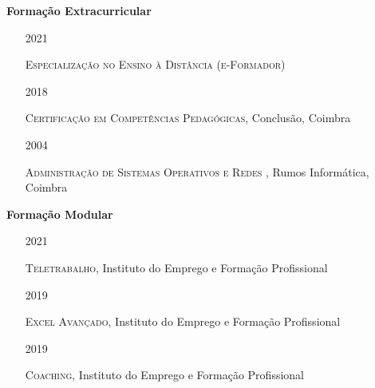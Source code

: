 \documentclass[10pt,a4paper,oneside]{article}
\newlength{\datewidth}
\newlength{\textindent}
\begin{document}
	\textbf{\hspace{\textindent}Formação Extracurricular}
	\begin{itemize}
		\item[\hspace{\datewidth}\scriptsize 2021] \parbox[t]{\dimexpr\linewidth-\datewidth-\textindent}{\textsc{Especialização no Ensino à Distância (e-Formador)}}
		\item[\hspace{\datewidth}\scriptsize 2018] \parbox[t]{\dimexpr\linewidth-\datewidth-\textindent}{\textsc{Certificação em Competências Pedagógicas}, Conclusão, Coimbra}
		\item[\hspace{\datewidth}\scriptsize 2004] \parbox[t]{\dimexpr\linewidth-\datewidth-\textindent}{\textsc{Administração de Sistemas Operativos e Redes }, Rumos Informática, Coimbra}
	\end{itemize}
	
	\vspace{5mm}
	
	\textbf{\hspace{\textindent}Formação Modular}
	\begin{itemize}
		\item[\hspace{\datewidth}\scriptsize 2021] \parbox[t]{\dimexpr\linewidth-\datewidth-\textindent}{\textsc{Teletrabalho}, Instituto do Emprego e Formação Profissional}
		\item[\hspace{\datewidth}\scriptsize 2019] \parbox[t]{\dimexpr\linewidth-\datewidth-\textindent}{\textsc{Excel Avançado}, Instituto do Emprego e Formação Profissional}
		\item[\hspace{\datewidth}\scriptsize 2019] \parbox[t]{\dimexpr\linewidth-\datewidth-\textindent}{\textsc{Coaching}, Instituto do Emprego e Formação Profissional}

	\end{itemize}
	
	\vspace{5mm}
	
\end{document}
